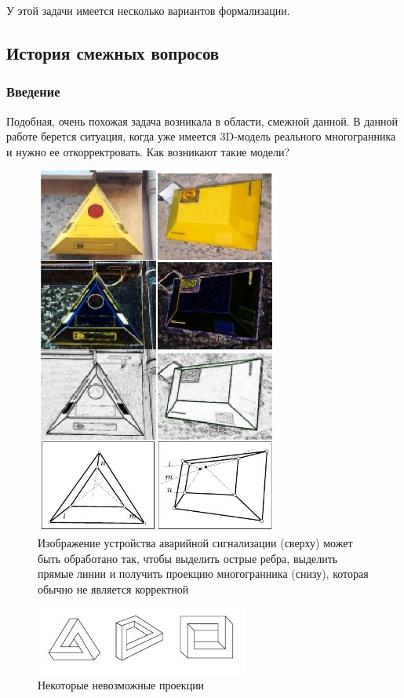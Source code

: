 \documentclass[a4paper,12pt, titlepage]{article}
\begin{document}
\begin{flushleft}
  У этой задачи имеется несколько вариантов формализации.
\end{flushleft}

\subsection{История смежных вопросов}
\subsubsection{Введение}
\begin{flushleft}
	Подобная, очень похожая задача возникала в области, смежной данной. В данной работе берется ситуация, когда
уже имеется 3D-модель реального многогранника и нужно ее откорректровать. Как возникают такие модели?
\end{flushleft}
\begin{flushleft}
	\begin{figure}[thb]
	    \includegraphics[width=8cm]{img/alarm-device.jpeg}
	    \caption{Изображение устройства аварийной сигнализации (сверху) может быть обработано так, чтобы выделить 
острые ребра, выделить прямые линии и получить проекцию многогранника (снизу), которая обычно не является корректной}
	    \label{alarm-device}
	\end{figure}
\end{flushleft}
\begin{flushleft}
	\begin{figure}[thb]
	    \includegraphics[width=7cm]{img/impossible.jpeg}
	    \caption{Некоторые невозможные проекции}
	    \label{impossible}
	\end{figure}
\end{flushleft}
\end{document}
